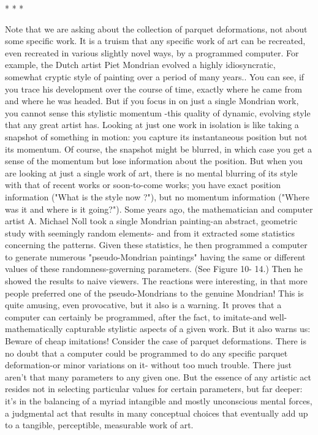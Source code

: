                                          *   *   *

        Note that we are asking about the collection of parquet deformations, not about
some specific work. It is a truism that any specific work of art can be recreated, even
recreated in various slightly novel ways, by a programmed computer.
        For example, the Dutch artist Piet Mondrian evolved a highly idiosyncratic,
somewhat cryptic style of painting over a period of many years.. You can see, if you trace
his development over the course of time, exactly where he came from and where he was
headed. But if you focus in on just a single Mondrian work, you cannot sense this stylistic
momentum -this quality of dynamic, evolving style that any great artist has. Looking at
just one work in isolation is like taking a snapshot of something in motion: you capture
its instantaneous position but not its momentum. Of course, the snapshot might be
blurred, in which case you get a sense of the momentum but lose information about the
position. But when you are looking at just a single work of art, there is no mental blurring
of its style with that of recent works or soon-to-come works; you have exact position
information ("What is the style now ?"), but no momentum information ("Where was it
and where is it going?").
        Some years ago, the mathematician and computer artist A. Michael Noll took a
single Mondrian painting-an abstract, geometric study with seemingly random elements-
and from it extracted some statistics concerning the patterns. Given these statistics, he
then programmed a computer to generate numerous "pseudo-Mondrian paintings" having
the same or different values of these randomness-governing parameters. (See Figure 10-
14.) Then he showed the results to naive viewers. The reactions were interesting, in that
more people preferred one of the pseudo-Mondrians to the genuine Mondrian!
        This is quite amusing, even provocative, but it also is a warning. It proves that a
computer can certainly be programmed, after the fact, to imitate-and well-mathematically
capturable stylistic aspects of a given work. But it also warns us: Beware of cheap
imitations!
        Consider the case of parquet deformations. There is no doubt that a computer
could be programmed to do any specific parquet deformation-or minor variations on it-
without too much trouble. There just aren't that many parameters to any given one. But
the essence of any artistic act resides not in selecting particular values for certain
parameters, but far deeper: it's in the balancing of a myriad intangible and mostly
unconscious mental forces, a judgmental act that results in many conceptual choices that
eventually add up to a tangible, perceptible, measurable work of art.




